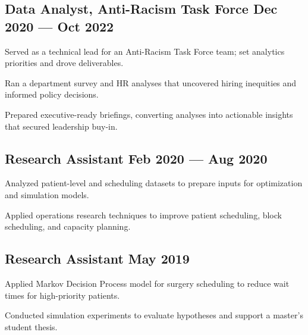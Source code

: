 \subsection{{Data Analyst, Anti-Racism Task Force \hfill Dec 2020 --- Oct 2022}}
\begin{zitemize}
    \setlength\itemsep{0.4em}
    \item Served as a technical lead for an Anti-Racism Task Force team; set analytics priorities and drove deliverables.
    \item Ran a department survey and HR analyses that uncovered hiring inequities and informed policy decisions.
    \item Prepared executive-ready briefings, converting analyses into actionable insights that secured leadership buy-in.
\end{zitemize}
\vspace{0.75em}


\subsection{{Research Assistant \hfill Feb 2020 --- Aug 2020}}
\begin{zitemize}
    \setlength\itemsep{0.4em}
    \item Analyzed patient-level and scheduling datasets to prepare inputs for optimization and simulation models.
    \item Applied operations research techniques to improve patient scheduling, block scheduling, and capacity planning.
\end{zitemize}
\vspace{0.75em}

\subsection{{Research Assistant \hfill May 2019}}
\begin{zitemize}
    \setlength\itemsep{0.4em}
    \item Applied Markov Decision Process model for surgery scheduling to reduce wait times for high-priority patients.
    \item Conducted simulation experiments to evaluate hypotheses and support a master's student thesis.
\end{zitemize}

